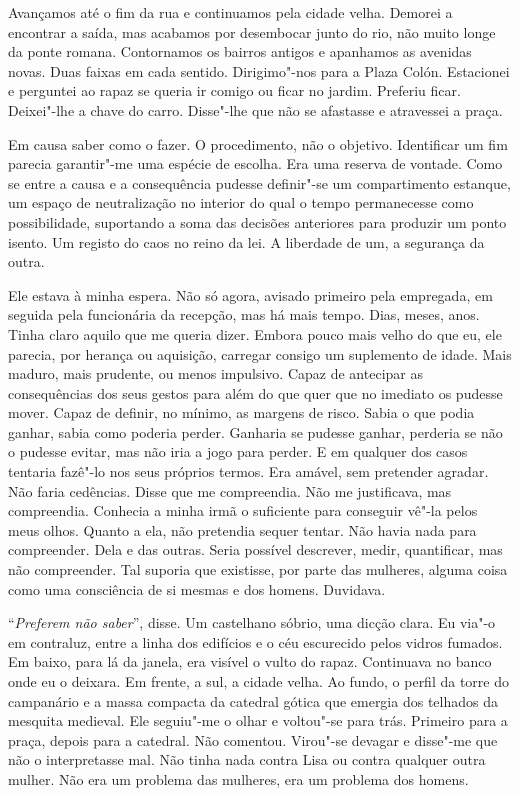 Avançamos até o fim da rua e continuamos pela cidade velha. Demorei a
encontrar a saída, mas acabamos por desembocar junto do rio, não muito
longe da ponte romana. Contornamos os bairros antigos e apanhamos as
avenidas novas. Duas faixas em cada sentido. Dirigimo"-nos para a Plaza
Colón. Estacionei e perguntei ao rapaz se queria ir comigo ou ficar no
jardim. Preferiu ficar. Deixei"-lhe a chave do carro. Disse"-lhe que não
se afastasse e atravessei a praça.

Em causa saber como o fazer. O procedimento, não o objetivo.
Identificar um fim parecia garantir"-me uma espécie de escolha. Era uma
reserva de vontade. Como se entre a causa e a consequência pudesse
definir"-se um compartimento estanque, um espaço de neutralização no
interior do qual o tempo permanecesse como possibilidade, suportando a
soma das decisões anteriores para produzir um ponto isento. Um registo
do caos no reino da lei. A liberdade de um, a segurança da outra.

Ele estava à minha espera. Não só agora, avisado primeiro pela
empregada, em seguida pela funcionária da recepção, mas há mais tempo.
Dias, meses, anos. Tinha claro aquilo que me queria dizer. Embora pouco
mais velho do que eu, ele parecia, por herança ou aquisição, carregar
consigo um suplemento de idade. Mais maduro, mais prudente, ou menos
impulsivo. Capaz de antecipar as consequências dos seus gestos para além
do que quer que no imediato os pudesse mover. Capaz de definir, no
mínimo, as margens de risco. Sabia o que podia ganhar, sabia como
poderia perder. Ganharia se pudesse ganhar, perderia se não o pudesse
evitar, mas não iria a jogo para perder. E em qualquer dos casos
tentaria fazê"-lo nos seus próprios termos. Era amável, sem pretender
agradar. Não faria cedências. Disse que me compreendia. Não me
justificava, mas compreendia. Conhecia a minha irmã o suficiente para
conseguir vê"-la pelos meus olhos. Quanto a ela, não pretendia sequer
tentar. Não havia nada para compreender. Dela e das outras. Seria
possível descrever, medir, quantificar, mas não compreender. Tal suporia
que existisse, por parte das mulheres, alguma coisa como uma consciência
de si mesmas e dos homens. Duvidava.

``\emph{Preferem não saber}'',
disse. Um castelhano sóbrio, uma dicção clara. Eu via"-o em contraluz,
entre a linha dos edifícios e o céu escurecido pelos vidros fumados. Em
baixo, para lá da janela, era visível o vulto do rapaz. Continuava no
banco onde eu o deixara. Em frente, a sul, a cidade velha. Ao fundo, o
perfil da torre do campanário e a massa compacta da catedral gótica que
emergia dos telhados da mesquita medieval. Ele seguiu"-me o olhar e
voltou"-se para trás. Primeiro para a praça, depois para a catedral. Não
comentou. Virou"-se devagar e disse"-me que não o interpretasse mal. Não
tinha nada contra Lisa ou contra qualquer outra mulher. Não era um
problema das mulheres, era um problema dos homens.

